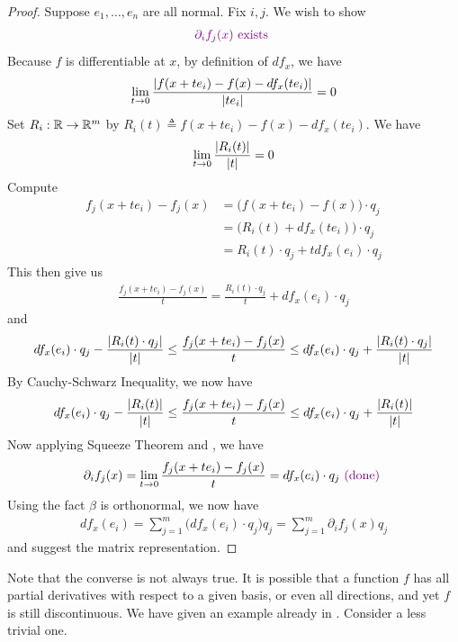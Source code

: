 \documentclass{report}
\begin{document}
\begin{proof}
Suppose $e_1,\dots ,e_n$ are all normal. Fix $i,j$. We wish to show 
 \begin{align*}
\textcolor{violet}{\partial_i f_j(x) \text{ exists }}
\end{align*}
Because $f$ is differentiable at $x$, by definition of $df_x$, we have
\begin{align*}
\lim_{t\to 0} \frac{\left|f(x+te_i)-f(x)-df_x(te_i)\right|}{\left|te_i\right|}=0
\end{align*}
Set $R_i:\mathbb{R}\rightarrow \mathbb{R}^m$ by $R_i(t)\triangleq f(x+te_i)-f(x)-df_x(te_i)$. We have 
\begin{align}
\label{Dij1}
  \lim_{t\to 0}\frac{\left|R_i(t)\right|}{\left|t\right|}=0
\end{align}
Compute
\begin{align*}
f_j(x+te_i)-f_j(x)&=\big(f(x+te_i)-f(x) \big)\cdot q_j\\
&=\big(R_i(t)+df_x(te_i) \big) \cdot q_j\\
&= R_i(t)\cdot q_j+ tdf_x(e_i)\cdot q_j
\end{align*}
This then give us 
\begin{align*}
\frac{f_j(x+te_i)-f_j(x)}{t}=\frac{R_i(t)\cdot q_j}{t}+ df_x(e_i)\cdot q_j
\end{align*}
and 
\begin{align*}
  df_x(e_i)\cdot q_j - \frac{\left|R_i(t)\cdot q_j\right|}{\left|t\right|} \leq \frac{f_j(x+te_i)-f_j(x)}{t}\leq df_x(e_i)\cdot q_j + \frac{\left|R_i(t)\cdot q_j\right|}{\left|t\right|}
\end{align*}
By Cauchy-Schwarz Inequality, we now have 
\begin{align*}
  df_x(e_i)\cdot q_j - \frac{\left|R_i(t)\right|}{\left|t\right|} \leq \frac{f_j(x+te_i)-f_j(x)}{t}\leq df_x(e_i)\cdot q_j + \frac{\left|R_i(t)\right|}{\left|t\right|}
\end{align*}
Now applying Squeeze Theorem and , we have  
\begin{align*}
\partial_i f_j(x)=\lim_{t\to 0} \frac{f_j(x+te_i)-f_j(x)}{t}=df_x(e_i)\cdot q_j \textcolor{violet}{\text{ (done) }}
\end{align*}
Using the fact $\beta $ is orthonormal, we now have 
\begin{align*}
df_x(e_i)=\sum_{j=1}^m \Big(df_x(e_i)\cdot q_j \Big)q_j=\sum_{j=1}^m \partial_if_j(x)q_j
\end{align*}
and suggest the matrix representation. 
\end{proof}
\begin{mdframed}
Note that the converse is not always true. It is possible that a function $f$ has all partial derivatives with respect to a given basis, or even all directions, and yet $f$ is still discontinuous. We have given an example already in . Consider a less trivial one. 
\end{mdframed}
\end{document}
